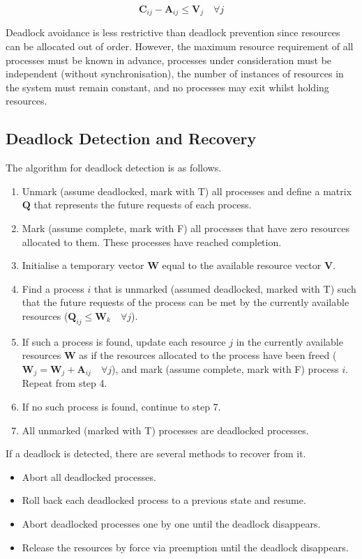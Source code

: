 \begin{equation*}
  \mathbf{C}_{ij} - \mathbf{A}_{ij} \le \mathbf{V}_j \quad \forall j
\end{equation*}

Deadlock avoidance is less restrictive than deadlock prevention since resources can be allocated out of order.
However, the maximum resource requirement of all processes must be known in advance, processes under consideration must be independent (without synchronisation), the number of instances of resources in the system must remain constant, and no processes may exit whilst holding resources.

\subsection{Deadlock Detection and Recovery}

The algorithm for deadlock detection is as follows.
\begin{enumerate}
  \item Unmark (assume deadlocked, mark with T) all processes and define a matrix \( \mathbf{Q} \) that represents the future requests of each process.
  \item Mark (assume complete, mark with F) all processes that have zero resources allocated to them.
  These processes have reached completion.
  \item Initialise a temporary vector \( \mathbf{W} \) equal to the available resource vector \( \mathbf{V} \).
  \item Find a process \( i \) that is unmarked (assumed deadlocked, marked with T) such that the future requests of the process can be met by the currently available resources (\( \mathbf{Q}_{ij} \le \mathbf{W}_k \quad \forall j \)).
  \item If such a process is found, update each resource \( j \) in the currently available resources \( \mathbf{W} \) as if the resources allocated to the process have been freed (\( \mathbf{W}_j = \mathbf{W}_j + \mathbf{A}_{ij} \quad \forall j \)), and mark (assume complete, mark with F) process \( i \).
  Repeat from step \num{4}.
  \item If no such process is found, continue to step \num{7}.
  \item All unmarked (marked with T) processes are deadlocked processes.
\end{enumerate}

If a deadlock is detected, there are several methods to recover from it.
\begin{itemize}
  \item Abort all deadlocked processes.
  \item Roll back each deadlocked process to a previous state and resume.
  \item Abort deadlocked processes one by one until the deadlock disappears.
  \item Release the resources by force via preemption until the deadlock disappears.
\end{itemize}

